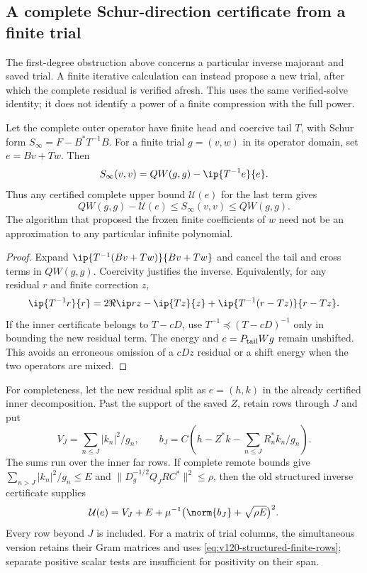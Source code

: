 \subsection*{A complete Schur-direction certificate from a finite trial}

The first-degree obstruction above concerns a particular inverse
majorant and saved trial. A finite iterative calculation can instead
propose a new trial, after which the complete residual is verified
afresh. This uses the same verified-solve identity; it does not
identify a power of a finite compression with the full power.

\begin{proposition}
\label{prop:v124-posterior-identity}
Let the complete outer operator have finite head and coercive
tail $T$, with Schur form $S_\infty=F-B^*T^{-1}B$.
For a finite trial $g=(v,w)$ in its operator domain, set
$e=Bv+Tw$. Then
\begin{equation}\label{eq:v124-posterior-identity}
 S_\infty(v,v)=QW(g,g)-\ip{T^{-1}e}{e}.
\end{equation}
Thus any certified complete upper bound $\mathcal U(e)$ for the
last term gives
\[
 QW(g,g)-\mathcal U(e)\le S_\infty(v,v)\le QW(g,g).
\]
The algorithm that proposed the frozen finite coefficients of $w$
need not be an approximation to any particular infinite polynomial.
\end{proposition}
\begin{proof}
Expand $\ip{T^{-1}(Bv+Tw)}{Bv+Tw}$ and cancel the tail and
cross terms in $QW(g,g)$. Coercivity justifies the inverse.
Equivalently, for any residual $r$ and finite correction $z$,
\[
 \ip{T^{-1}r}{r}
 =2\Re\ip rz-\ip{Tz}{z}
       +\ip{T^{-1}(r-Tz)}{r-Tz}.
\]
If the inner certificate belongs to $T-cD$, use
$T^{-1}\preceq(T-cD)^{-1}$ only in bounding the new residual
term. The energy and $e=P_{\rm tail}Wg$ remain unshifted.
This avoids an erroneous omission of a $cDz$ residual or a shift
energy when the two operators are mixed.
\end{proof}

For completeness, let the new residual split as $e=(h,k)$ in
the already certified inner decomposition. Past the support of
the saved $Z$, retain rows through $J$ and put
\[
 V_J=\sum_{n\le J}|k_n|^2/g_n,\qquad
 b_J=C\left(h-Z^*k-\sum_{n\le J}R_n^*k_n/g_n\right).
\]
The sums run over the inner far rows. If complete remote bounds
give $\sum_{n>J}|k_n|^2/g_n\le E$ and
$\|D_g^{-1/2}Q_JRC^*\|^2\le\rho$, then the old structured
inverse certificate supplies
\begin{equation}\label{eq:v124-posterior-upper}
 \mathcal U(e)=V_J+E+
       \mu^{-1}\bigl(\norm{b_J}+\sqrt{\rho E}\bigr)^2.
\end{equation}
Every row beyond $J$ is included. For a matrix of trial columns,
the simultaneous version retains their Gram matrices and uses
\eqref{eq:v120-structured-finite-rows}; separate positive scalar
tests are insufficient for positivity on their span.

